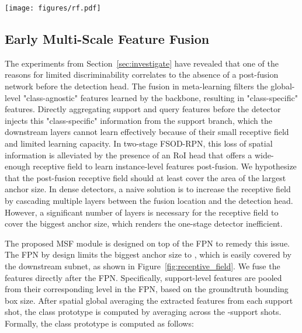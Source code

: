 \documentclass[10pt,twocolumn,letterpaper]{article}
\begin{document}
\begin{figure*}[t!]
 \centering
 \texttt{[image: figures/rf.pdf]}
 \caption{A depiction of the post-fusion network receptive field (RF) impact. To illustrate, we use an example query image from the MS-COCO~\cite{coco} dataset with an annotated bounding box of size . The upper part shows that a YOLOv2-based dense meta-detector~\cite{FSRW} suffers from a narrow receptive field that is is unable to cover the whole anchor area (i.e., ). On the other hand, the proposed FSRN exploits the FPN~\cite{fpn} via the introduced MSF along with both deeper and wider post-fusion network to process the whole anchor area (i.e., ). }  \label{fig:receptive_field}\vspace{-1.5em}
\end{figure*} \subsection{Early Multi-Scale Feature Fusion}
The experiments from Section~\ref{sec:investigate} have revealed that one of the reasons for limited discriminability correlates to the absence of a post-fusion network before the detection head. The fusion in meta-learning filters the global-level "class-agnostic" features learned by the backbone, resulting in "class-specific" features. Directly aggregating support and query features before the detector injects this "class-specific" information from the support branch, which the downstream layers cannot learn effectively because of their small receptive field and limited learning capacity. In two-stage FSOD-RPN, this loss of spatial information is alleviated by the presence of an RoI head that offers a wide-enough receptive field to learn instance-level features post-fusion. We hypothesize that the post-fusion receptive field should at least cover the area of the largest anchor size. In dense detectors, a naive solution is to increase the receptive field by cascading multiple layers between the fusion location and the detection head. However, a significant number of layers is necessary for the receptive field to cover the biggest anchor size, which renders the one-stage detector inefficient. 

The proposed MSF module is designed on top of the FPN to remedy this issue. The FPN by design limits the biggest anchor size to , which is easily covered by the downstream subnet, as shown in Figure~\ref{fig:receptive_field}. We fuse the features directly after the FPN. Specifically, support-level features are pooled from their corresponding level  in the FPN, based on the groundtruth bounding box size. After spatial global averaging the extracted features from each support shot, the class prototype is computed by averaging across the -support shots. Formally, the class prototype  is computed as follows:
\end{document}
